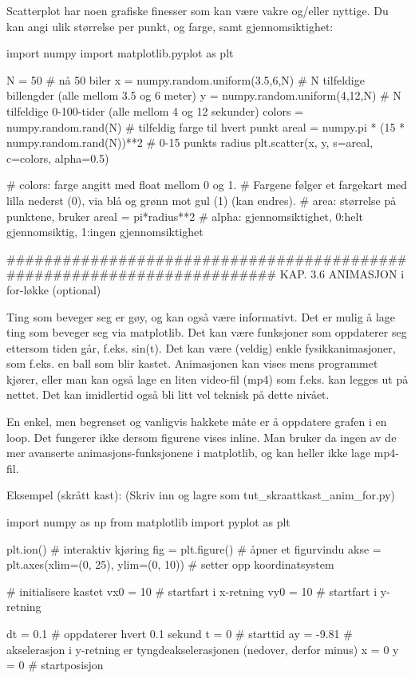 \documentclass[a4paper,11pt,utf8]{book}
\begin{document}
Scatterplot har noen grafiske finesser som kan være vakre og/eller nyttige.
Du kan angi ulik størrelse per punkt, og farge, samt gjennomsiktighet: 

import numpy 
import matplotlib.pyplot as plt

N = 50   # nå 50 biler 
x = numpy.random.uniform(3.5,6,N)   # N tilfeldige billengder (alle mellom 3.5 og 6 meter)
y = numpy.random.uniform(4,12,N)    # N tilfeldige 0-100-tider (alle mellom 4 og 12 sekunder)
colors = numpy.random.rand(N)       # tilfeldig farge til hvert punkt
areal = numpy.pi * (15 * numpy.random.rand(N))**2    # 0-15 punkts radius 
plt.scatter(x, y, s=areal, c=colors, alpha=0.5)

# colors: farge angitt med float mellom 0 og 1.
# Fargene følger et fargekart med lilla nederst (0), via blå og grønn mot gul (1) (kan endres). 
# area: størrelse på punktene, bruker areal = pi*radius**2
# alpha: gjennomsiktighet, 0:helt gjennomsiktig, 1:ingen gjennomsiktighet




######################################################################## 
KAP. 3.6  ANIMASJON i for-løkke  (optional)

Ting som beveger seg er gøy, og kan også være informativt. 
Det er mulig å lage ting som beveger seg via matplotlib.
Det kan være funksjoner som oppdaterer seg ettersom tiden går, f.eks. sin(t).
Det kan være (veldig) enkle fysikkanimasjoner, som f.eks. en ball som blir kastet.
Animasjonen kan vises mens programmet kjører, eller man kan også lage en liten
video-fil (mp4) som f.eks. kan legges ut på nettet.
Det kan imidlertid også bli litt vel teknisk på dette nivået. 


En enkel, men begrenset og vanligvis hakkete måte er å oppdatere grafen i en loop. 
Det fungerer ikke dersom figurene vises inline.
Man bruker da ingen av de mer avanserte animasjons-funksjonene i matplotlib,
og kan heller ikke lage mp4-fil.

Eksempel (skrått kast):
(Skriv inn og lagre som tut_skraattkast_anim_for.py) 

import numpy as np
from matplotlib import pyplot as plt

plt.ion()   # interaktiv kjøring
fig = plt.figure()    # åpner et figurvindu
akse = plt.axes(xlim=(0, 25), ylim=(0, 10))  # setter opp koordinatsystem

# initialisere kastet
vx0 = 10       # startfart i x-retning
vy0 = 10       # startfart i y-retning

dt = 0.1       # oppdaterer hvert 0.1 sekund
t = 0          # starttid
ay = -9.81     # akselerasjon i y-retning er tyngdeakselerasjonen (nedover, derfor minus)
x = 0 
y = 0          # startposisjon 
\end{document}
